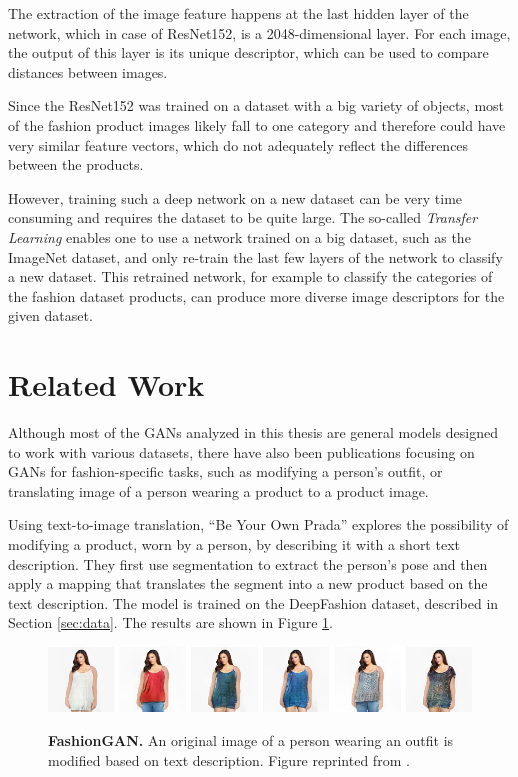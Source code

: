 \documentclass[12pt]{report}
\begin{document}
The extraction of the image feature happens at the last hidden layer of the network, which in case of ResNet152, is a 2048-dimensional layer. For each image, the output of this layer is its unique descriptor, which can be used to compare distances between images.

Since the ResNet152 was trained on a dataset with a big variety of objects, most of the fashion product images likely fall to one category and therefore could have very similar feature vectors, which do not adequately reflect the differences between the products.

However, training such a deep network on a new dataset can be very time consuming and requires the dataset to be quite large. The so-called \textit{Transfer Learning} enables one to use a network trained on a big dataset, such as the ImageNet dataset, and only re-train the last few layers of the network to classify a new dataset. This retrained network, for example to classify the categories of the fashion dataset products, can produce more diverse image descriptors for the given dataset.

\section{Related Work} \label{sec:related}
Although most of the GANs analyzed in this thesis are general models designed to work with various datasets, there have also been publications focusing on GANs for fashion-specific tasks, such as modifying a person's outfit, or translating image of a person wearing a product to a product image.

Using text-to-image translation, ``Be Your Own Prada'' \cite{zhu_be_2017} explores the possibility of modifying a product, worn by a person, by describing it with a short text description. They first use segmentation to extract the person's pose and then apply a mapping that translates the segment into a new product based on the text description. The model is trained on the DeepFashion dataset, described in Section \ref{sec:data}. The results are shown in Figure \ref{fig:fashiongan}.

\begin{figure}[h]
\centering
{\includegraphics[width=\linewidth]{03_analysis/related/fashiongan}}
\caption{\label{fig:fashiongan} \textbf{FashionGAN.} An original image of a person wearing an outfit is modified based on text description. Figure reprinted from \cite{zhu_be_2017}.}
\end{figure}
\end{document}
